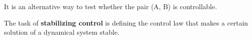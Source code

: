 It is an alternative way to test whether the pair (A, B) is controllable. 


\begin{tcolorbox}[colback=green!10,colframe=green!50!black,title=\textbf{PBH criterion}]
    The task of \textbf{stabilizing control} is defining the control law that makes a certain solution of 
    a dynamical system stable.
\end{tcolorbox}



























